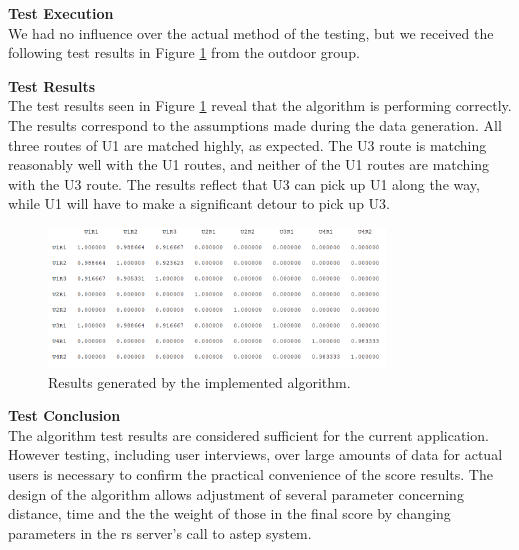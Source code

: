 \textbf{Test Execution}\\
We had no influence over the actual method of the testing, but we received the following test results in Figure \ref{fig:algresults} from the outdoor group.


\textbf{Test Results}\\
The test results seen in Figure \ref{fig:algresults} reveal that the algorithm is performing correctly.
The results correspond to the assumptions made during the data generation.
All three routes of U1 are matched highly, as expected.
The U3 route is matching reasonably well with the U1 routes, and neither of the U1 routes are matching with the U3 route.
The results reflect that U3 can pick up U1 along the way, while U1 will have to make a significant detour to pick up U3.

\begin{figure}[h]
	\centering
	\includegraphics[width=0.8\textwidth]{figures/newtestresultrs.png}
	\caption{Results generated by the implemented algorithm.}
	\label{fig:algresults}
\end{figure}


\textbf{Test Conclusion}\\
The algorithm test results are considered sufficient for the current application. 
However testing, including user interviews, over large amounts of data for actual users is necessary to confirm the practical convenience of the score results.
The design of the algorithm allows adjustment of several parameter concerning distance, time and the the weight of those in the final score by changing parameters in the \gls{rs} server's call to \gls{astep} system. 